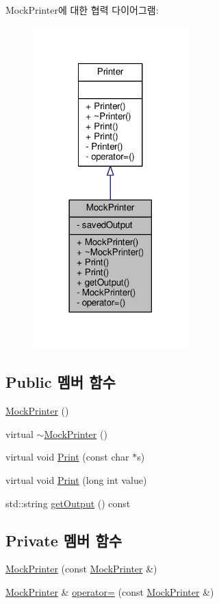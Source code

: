 Mock\+Printer에 대한 협력 다이어그램\+:
\nopagebreak
\begin{figure}[H]
\begin{center}
\leavevmode
\includegraphics[width=170pt]{class_mock_printer__coll__graph}
\end{center}
\end{figure}
\subsection*{Public 멤버 함수}
\begin{DoxyCompactItemize}
\item 
\hyperlink{class_mock_printer_a9c59ab6521e8f34ba1d476caaaa8a8f4}{Mock\+Printer} ()
\item 
virtual \hyperlink{class_mock_printer_acdc5a3b3d58dfacf461fa7cc411f50ac}{$\sim$\+Mock\+Printer} ()
\item 
virtual void \hyperlink{class_mock_printer_acf98db8c613518bf4375a8841556dbe2}{Print} (const char $\ast$s)
\item 
virtual void \hyperlink{class_mock_printer_a5314eb94033e6305bb593e3927df427a}{Print} (long int value)
\item 
std\+::string \hyperlink{class_mock_printer_afffd863f221a949e5dbf381be780a172}{get\+Output} () const 
\end{DoxyCompactItemize}
\subsection*{Private 멤버 함수}
\begin{DoxyCompactItemize}
\item 
\hyperlink{class_mock_printer_ab4f196ce85a6e6672ea055bf24b48ba8}{Mock\+Printer} (const \hyperlink{class_mock_printer}{Mock\+Printer} \&)
\item 
\hyperlink{class_mock_printer}{Mock\+Printer} \& \hyperlink{class_mock_printer_af062da68fecb72968eab872e5ac238c8}{operator=} (const \hyperlink{class_mock_printer}{Mock\+Printer} \&)
\end{DoxyCompactItemize}
